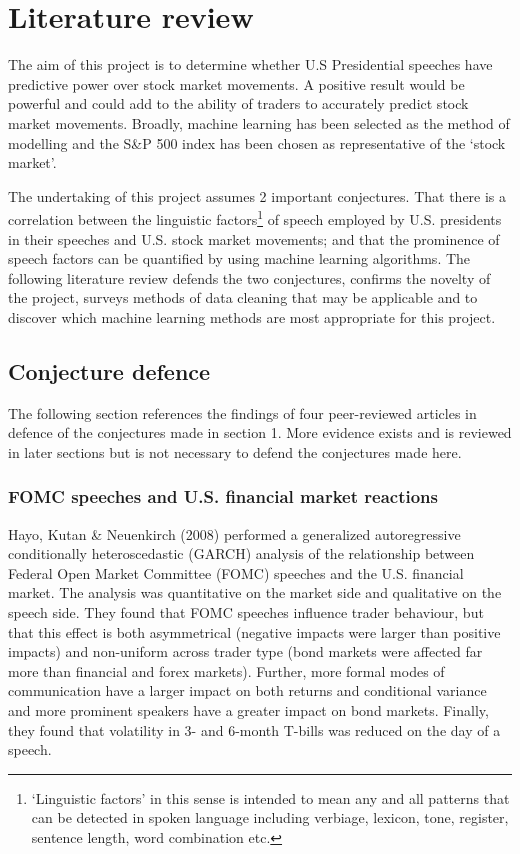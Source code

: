 \documentclass[11pt,preprint, authoryear]{elsarticle}
\numberwithin{equation}{section}
\numberwithin{figure}{section}
\numberwithin{table}{section}
\let\rmarkdownfootnote\footnote%
\def\footnote{\protect\rmarkdownfootnote}
\begin{document}
\hypertarget{literature-review}{%
\section{Literature review}\label{literature-review}}

The aim of this project is to determine whether U.S Presidential
speeches have predictive power over stock market movements. A positive
result would be powerful and could add to the ability of traders to
accurately predict stock market movements. Broadly, machine learning has
been selected as the method of modelling and the S\&P 500 index has been
chosen as representative of the `stock market'.

The undertaking of this project assumes 2 important conjectures. That
there is a correlation between the linguistic factors\footnote{`Linguistic
  factors' in this sense is intended to mean any and all patterns that
  can be detected in spoken language including verbiage, lexicon, tone,
  register, sentence length, word combination etc.} of speech employed
by U.S. presidents in their speeches and U.S. stock market movements;
and that the prominence of speech factors can be quantified by using
machine learning algorithms. The following literature review defends the
two conjectures, confirms the novelty of the project, surveys methods of
data cleaning that may be applicable and to discover which machine
learning methods are most appropriate for this project.

\hypertarget{conjecture-defence}{%
\subsection{Conjecture defence}\label{conjecture-defence}}

The following section references the findings of four peer-reviewed
articles in defence of the conjectures made in section 1. More evidence
exists and is reviewed in later sections but is not necessary to defend
the conjectures made here.

\hypertarget{fomc-speeches-and-u.s.-financial-market-reactions}{%
\subsubsection{FOMC speeches and U.S. financial market
reactions}\label{fomc-speeches-and-u.s.-financial-market-reactions}}

Hayo, Kutan \& Neuenkirch (2008) performed a generalized autoregressive
conditionally heteroscedastic (GARCH) analysis of the relationship
between Federal Open Market Committee (FOMC) speeches and the U.S.
financial market. The analysis was quantitative on the market side and
qualitative on the speech side. They found that FOMC speeches influence
trader behaviour, but that this effect is both asymmetrical (negative
impacts were larger than positive impacts) and non-uniform across trader
type (bond markets were affected far more than financial and forex
markets). Further, more formal modes of communication have a larger
impact on both returns and conditional variance and more prominent
speakers have a greater impact on bond markets. Finally, they found that
volatility in 3- and 6-month T-bills was reduced on the day of a speech.
\end{document}
